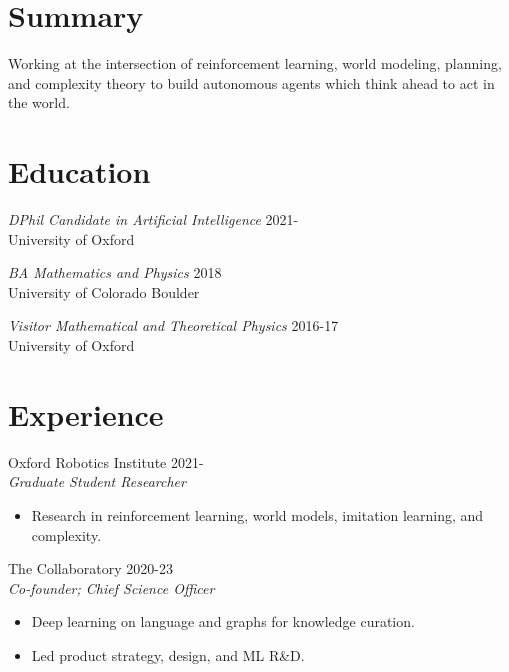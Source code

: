 \documentclass[margin]{res}
\begin{document}
\begin{resume}
    \section{Summary}
    Working at the intersection of reinforcement learning, world modeling, planning, and complexity theory to
    build autonomous agents which think ahead to act in the world.


    \section{Education} {\sl DPhil Candidate in Artificial Intelligence } \hfill 2021-\\
                University of Oxford

  {\sl BA Mathematics and Physics} \hfill 2018\\
  University of Colorado Boulder

  {\sl Visitor Mathematical and Theoretical Physics} \hfill 2016-17\\
  University of Oxford

\section{Experience} Oxford Robotics Institute \hfill 2021- \\
                 {\sl Graduate Student Researcher}
                 \begin{itemize}  \itemsep -2pt %
                 \item Research in reinforcement learning, world models, imitation learning, and complexity.
                 \end{itemize}

                The Collaboratory \hfill 2020-23 \\
                 {\sl Co-founder; Chief Science Officer}
                 \begin{itemize}  \itemsep -2pt %
                 \item Deep learning on language and graphs for knowledge curation.
                 \item Led product strategy, design, and ML R\&D.
                 \end{itemize}


\end{resume}
\end{document}
